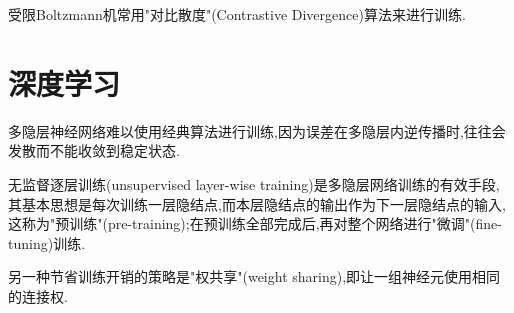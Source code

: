 受限Boltzmann机常用"对比散度"(Contrastive Divergence)算法来进行训练.

\section{深度学习}

多隐层神经网络难以使用经典算法进行训练,因为误差在多隐层内逆传播时,往往会发散而不能收敛到稳定状态.

无监督逐层训练(unsupervised layer-wise training)是多隐层网络训练的有效手段,其基本思想是每次训练一层隐结点,而本层隐结点的输出作为下一层隐结点的输入,这称为"预训练"(pre-training);在预训练全部完成后,再对整个网络进行"微调"(fine-tuning)训练.

另一种节省训练开销的策略是"权共享"(weight sharing),即让一组神经元使用相同的连接权.